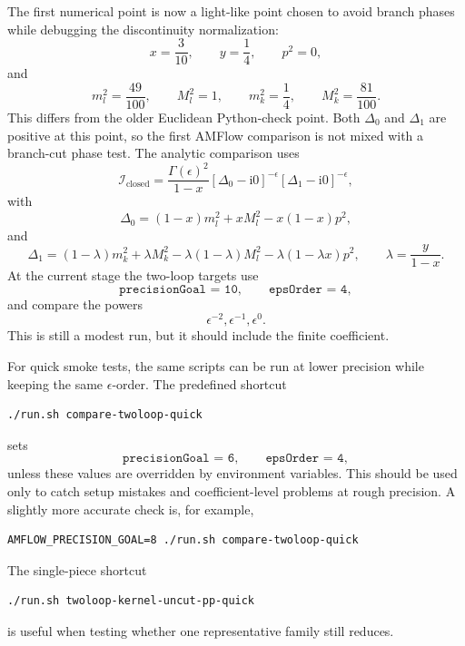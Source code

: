\documentclass[11pt]{article}
\newcommand{\ii}{\mathrm{i}}
\newcommand{\eps}{\epsilon}
\newcommand{\WL}[1]{\texttt{#1}}
\begin{document}
The first numerical point is now a light-like point chosen to avoid branch
phases while debugging the discontinuity normalization:
\begin{equation}
  x=\frac{3}{10},\qquad y=\frac14,\qquad p^2=0,
\end{equation}
and
\begin{equation}
  m_l^2=\frac{49}{100},\qquad
  M_l^2=1,\qquad
  m_k^2=\frac14,\qquad
  M_k^2=\frac{81}{100}.
\end{equation}
This differs from the older Euclidean Python-check point. Both \(\Delta_0\)
and \(\Delta_1\) are positive at this point, so the first AMFlow comparison is
not mixed with a branch-cut phase test.
The analytic comparison uses
\begin{equation}
  \mathcal I_{\mathrm{closed}}
  =
  \frac{\Gamma(\eps)^2}{1-x}
  [\Delta_0-\ii0]^{-\eps}
  [\Delta_1-\ii0]^{-\eps},
\end{equation}
with
\begin{equation}
  \Delta_0=(1-x)m_l^2+xM_l^2-x(1-x)p^2,
\end{equation}
and
\begin{equation}
  \Delta_1=
  \left(1-\lambda\right)m_k^2+\lambda M_k^2
  -\lambda(1-\lambda)M_l^2
  -\lambda(1-\lambda x)p^2,
  \qquad
  \lambda=\frac{y}{1-x}.
\end{equation}
At the current stage the two-loop targets use
\begin{equation}
  \WL{precisionGoal = 10},\qquad \WL{epsOrder = 4},
\end{equation}
and compare the powers
\begin{equation}
  \eps^{-2},\eps^{-1},\eps^0.
\end{equation}
This is still a modest run, but it should include the finite coefficient.

For quick smoke tests, the same scripts can be run at lower precision while
keeping the same \(\eps\)-order. The predefined shortcut
\begin{verbatim}
./run.sh compare-twoloop-quick
\end{verbatim}
sets
\begin{equation}
  \WL{precisionGoal = 6},\qquad \WL{epsOrder = 4},
\end{equation}
unless these values are overridden by environment variables. This should be
used only to catch setup mistakes and coefficient-level problems at rough
precision. A slightly more accurate check is, for example,
\begin{verbatim}
AMFLOW_PRECISION_GOAL=8 ./run.sh compare-twoloop-quick
\end{verbatim}
The single-piece shortcut
\begin{verbatim}
./run.sh twoloop-kernel-uncut-pp-quick
\end{verbatim}
is useful when testing whether one representative family still reduces.
\end{document}
